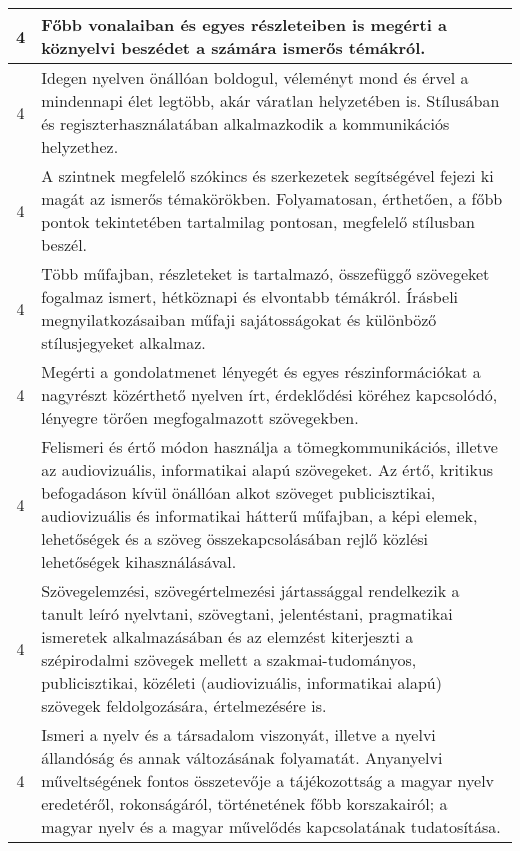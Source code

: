 \begin{longtable}{c | p{12cm} }
                                
                                          4 &  Főbb vonalaiban és egyes részleteiben is megérti a köznyelvi beszédet a számára ismerős témákról. \\ \hline
                                          4 &  Idegen nyelven önállóan boldogul, véleményt mond és érvel a mindennapi élet legtöbb, akár váratlan helyzetében is. Stílusában és regiszterhasználatában alkalmazkodik a kommunikációs helyzethez. \\ \hline
                                          4 &  A szintnek megfelelő szókincs és szerkezetek segítségével fejezi ki magát az ismerős témakörökben. Folyamatosan, érthetően, a főbb pontok tekintetében tartalmilag pontosan, megfelelő stílusban beszél. \\ \hline
                                          4 &  Több műfajban, részleteket is tartalmazó, összefüggő szövegeket fogalmaz ismert, hétköznapi és elvontabb témákról. Írásbeli megnyilatkozásaiban műfaji sajátosságokat és különböző stílusjegyeket alkalmaz. \\ \hline
                                          4 &  Megérti a gondolatmenet lényegét és egyes részinformációkat a nagyrészt közérthető nyelven írt, érdeklődési köréhez kapcsolódó, lényegre törően megfogalmazott szövegekben. \\ \hline
                                          4 &  Felismeri és értő módon használja a tömegkommunikációs, illetve az audiovizuális, informatikai alapú szövegeket. Az értő, kritikus befogadáson kívül önállóan alkot szöveget  publicisztikai, audiovizuális és informatikai hátterű műfajban, a képi elemek, lehetőségek és a szöveg összekapcsolásában rejlő közlési lehetőségek kihasználásával. \\ \hline
                                          4 &  Szövegelemzési, szövegértelmezési jártassággal rendelkezik a tanult leíró nyelvtani, szövegtani, jelentéstani, pragmatikai ismeretek alkalmazásában és az elemzést kiterjeszti a szépirodalmi szövegek mellett a szakmai-tudományos, publicisztikai, közéleti (audiovizuális, informatikai alapú) szövegek feldolgozására, értelmezésére is. \\ \hline
                                          4 &  Ismeri a nyelv és a társadalom viszonyát, illetve a nyelvi állandóság és annak változásának folyamatát. Anyanyelvi műveltségének fontos összetevője a tájékozottság a magyar nyelv eredetéről, rokonságáról, történetének főbb korszakairól; a magyar nyelv és a magyar művelődés kapcsolatának tudatosítása. \\ \hline

\end{longtable}
